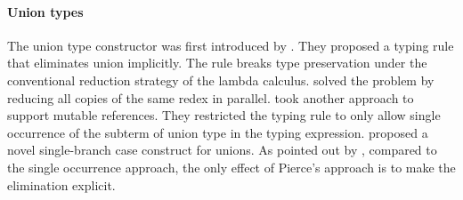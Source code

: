 \paragraph{Union types}
\begin{comment}
Set-theoretic unions have sound theory and extensively studied in
mathematics. Set-theoretic unions correspond to union types or
disjoint union types in programming languages. Disjoint union types
are also called sum types or variants.  Constructors are explicitly
labeled in disjoint union types and expressions are manipulated using
corresponding labels. Few other interesting calculi (and this paper)
do not use labels and provide type-based union elimination.
\end{comment}
The union type constructor was first introduced by \citet{macqueen1984ideal}.
They proposed a typing rule that eliminates union implicitly.
The rule breaks type preservation under
the conventional reduction strategy of the lambda calculus.
\citet{barbanera1995intersection} solved the problem by reducing all
copies of the same redex in parallel.
\citet{dunfield2003type,dunfield2014elaborating} took another approach to support
mutable references. They restricted the typing rule to only allow single
occurrence of the subterm of union type in the typing expression.
\citet{pierce1991programming} proposed a novel single-branch case construct
for unions. As pointed out by \citet{dunfield2003type}, compared to the single
occurrence approach, the only effect of Pierce's approach
is to make the elimination explicit.
\begin{comment}
Moreover, while \citet{dunfield2014elaborating} shows that
subtyping is not necessary for elaboration, it is not obvious how to generalize
elaboration to support subtyping relations such as
\lstinline{Student <: Person} without using the subtyping rule. If the
elaboration were generalized further to support such a subtyping relation, then
a student with type \lstinline{Student | Person} can also be tagged
non-deterministically.
\end{comment}




